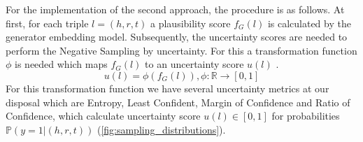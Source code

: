 For the implementation of the second approach, the procedure is as follows.
At first, for each triple $l = (h, r, t)$ a plausibility score $f_G(l)$ is calculated by the generator embedding model. 
Subsequently, the uncertainty scores are needed to perform the Negative Sampling by uncertainty.
For this a transformation function $\phi$ is needed which maps $f_G(l)$ to an uncertainty score $u(l)$ .
\begin{equation}
    u(l) = \phi(f_G(l)), \phi: \mathbb{R} \rightarrow [0,1]
\end{equation}
For this transformation function we have several uncertainty metrics at our disposal which are Entropy, Least Confident, Margin of Confidence and Ratio of Confidence, which calculate uncertainty score $u(l) \in [0, 1]$ for probabilities $\mathbb{P}(y = 1 | (h,r,t))$ (\autoref{fig:sampling_distributions}).
